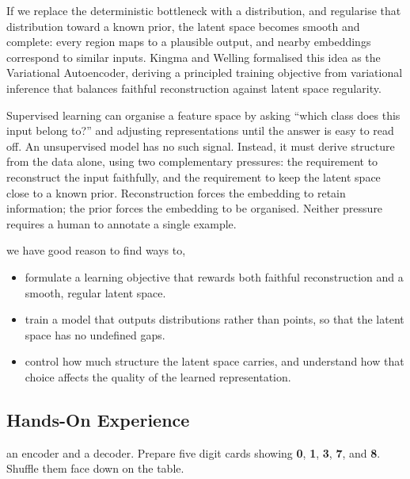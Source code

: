 If we replace the deterministic bottleneck with a distribution,
and regularise that distribution toward a known prior,
the latent space becomes smooth and complete:
every region maps to a plausible output, and nearby embeddings correspond to similar inputs.
Kingma and Welling\cite{KingmaWelling2014} formalised this idea as the Variational Autoencoder,
deriving a principled training objective from variational inference that balances
faithful reconstruction against latent space regularity.

Supervised learning can organise a feature space by asking ``which class does this input belong to?'' and adjusting representations until the answer is easy to read off.
An unsupervised model has no such signal.
Instead, it must derive structure from the data alone, using two complementary pressures: the requirement to reconstruct the input faithfully, and the requirement to keep the latent space close to a known prior.
Reconstruction forces the embedding to retain information; the prior forces the embedding to be organised.
Neither pressure requires a human to annotate a single example.

 we have good reason to find ways to,
\begin{itemize}
    \item formulate a learning objective that rewards both faithful reconstruction and a smooth, regular latent space.
    \item train a model that outputs distributions rather than points, so that the latent space has no undefined gaps.
    \item control how much structure the latent space carries, and understand how that choice affects the quality of the learned representation.
\end{itemize}








\newpage
\subsection{Hands-On Experience}

 an encoder and a decoder.
Prepare five digit cards showing \textbf{0}, \textbf{1}, \textbf{3}, \textbf{7}, and \textbf{8}.
Shuffle them face down on the table.

